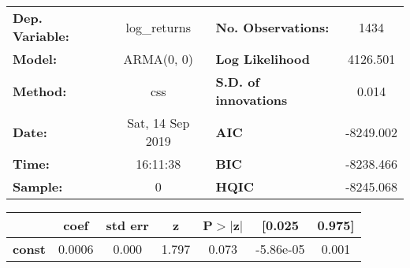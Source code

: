 \begin{center}
\begin{tabular}{lclc}
\toprule
\textbf{Dep. Variable:} &   log\_returns   & \textbf{  No. Observations:  } &    1434     \\
\textbf{Model:}         &    ARMA(0, 0)    & \textbf{  Log Likelihood     } &  4126.501   \\
\textbf{Method:}        &       css        & \textbf{  S.D. of innovations} &   0.014     \\
\textbf{Date:}          & Sat, 14 Sep 2019 & \textbf{  AIC                } & -8249.002   \\
\textbf{Time:}          &     16:11:38     & \textbf{  BIC                } & -8238.466   \\
\textbf{Sample:}        &        0         & \textbf{  HQIC               } & -8245.068   \\
\bottomrule
\end{tabular}
\begin{tabular}{lcccccc}
               & \textbf{coef} & \textbf{std err} & \textbf{z} & \textbf{P$> |$z$|$} & \textbf{[0.025} & \textbf{0.975]}  \\
\midrule
\textbf{const} &       0.0006  &        0.000     &     1.797  &         0.073        &    -5.86e-05    &        0.001     \\
\bottomrule
\end{tabular}
\end{center}
